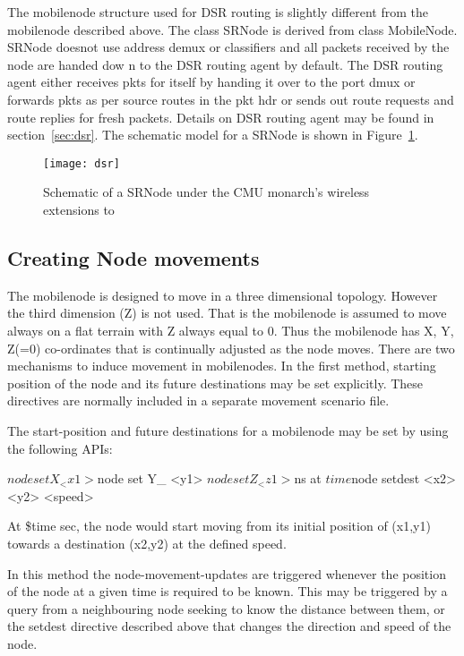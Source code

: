 The mobilenode structure used for DSR routing is slightly different from
the mobilenode described above. The class SRNode is derived from class
MobileNode. SRNode doesnot use address demux or classifiers and all
packets received by the node are handed dow   
n to the DSR routing agent by default. The DSR routing agent either
receives pkts for itself by handing it over to the port dmux or forwards
pkts as per source routes in the pkt hdr or sends out route requests and
route replies for fresh packets. Details    
on DSR routing agent may be found in section~\ref{sec:dsr}. The schematic
model for a SRNode is shown in Figure~\ref{fig:mobilenode-dsr}. 
\begin{figure}[tb]
    \centerline{\texttt{[image: dsr]}}
    \caption{Schematic of a SRNode under the CMU monarch's wireless
      extensions to \ns} 
    \label{fig:mobilenode-dsr}
\end{figure}

\subsection{Creating Node movements}
\label{sec:mobilenode-movements}

The mobilenode is designed to move in a three dimensional topology. However the third dimension (Z) is not used. That is the mobilenode is assumed to move always on a flat terrain with Z always equal to 0.
Thus the mobilenode has X, Y, Z(=0) co-ordinates that is continually adjusted as the node moves. There are two mechanisms to induce movement in mobilenodes. 
In the first method, starting position of the node and its future destinations may be set explicitly. These directives are normally included in a separate movement scenario file. 

The start-position and future destinations for a mobilenode may be set
by using the following APIs:
\begin{program}
$node set X_ <x1>
$node set Y_ <y1>
$node set Z_ <z1>

$ns at $time $node setdest <x2> <y2> <speed> 
\end{program}
At \$time sec, the node would start moving from its initial position 
of (x1,y1) towards a destination (x2,y2) at the defined speed.

In this method the node-movement-updates are triggered whenever the
position of the node at a given time is required to be known. This
may be triggered by a query from a neighbouring node seeking to know
the distance between them, or the setdest directive
described above that changes the direction and speed of the node.

